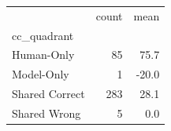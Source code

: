 \begin{tabular}{lrr}
\toprule
 & count & mean \\
cc_quadrant &  &  \\
\midrule
Human-Only & 85 & 75.7 \\
Model-Only & 1 & -20.0 \\
Shared Correct & 283 & 28.1 \\
Shared Wrong & 5 & 0.0 \\
\bottomrule
\end{tabular}
